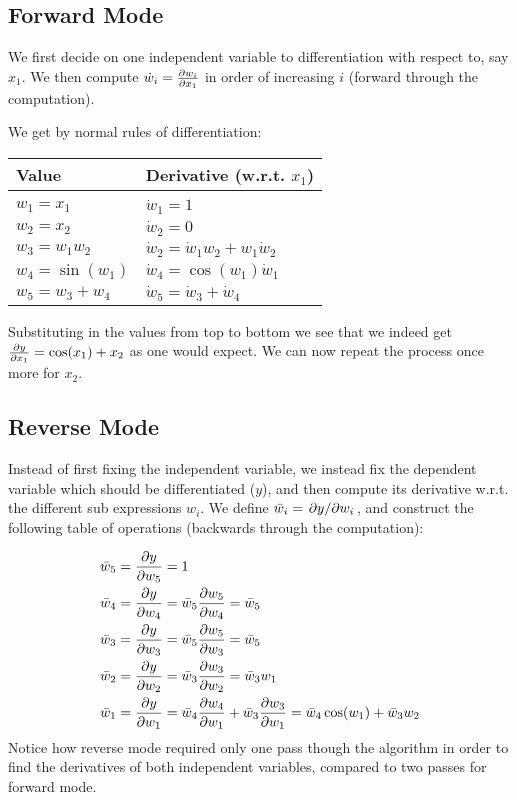 \documentclass[Thesis.tex]{subfiles}
\begin{document}
\subsection{Forward Mode}

We first decide on one independent variable to differentiation with respect to,
say $x_1$. We then compute $\dot w_i = \pdv{w_i}{x_1}$ in order of increasing
$i$ (forward through the computation).

We get by normal rules of differentiation:

\begin{center}
  \begin{tabular}{ll}
    Value & Derivative (w.r.t. $x_1$)\\\hline\\
    $w_1 = x_1$ & $\dot w_1 = 1$\\
    $w_2 = x_2$ & $\dot w_2 = 0$\\
    $w_3 = w_1w_2$ & $\dot w_2 = \dot w_1 w_2 + w_1\dot w_2$\\
    $w_4 = \sin(w_1)$ & $\dot w_4 = \cos(w_1)\dot w_1$\\
    $w_5 = w_3 + w_4$ & $\dot w_5 = \dot w_3 +\dot w_4$\\
  \end{tabular}
\end{center}
Substituting in the values from top to bottom we see that we indeed get
$\pdv{y}{x_1}=\cos(x_1)+x_2$ as one would expect. We can now repeat the process
once more for $x_2$.

\subsection{Reverse Mode}

Instead of first fixing the independent variable, we
instead fix the dependent variable which should be differentiated (\(y\)), and
then compute its derivative w.r.t. the different sub expressions $w_i$. We
define \(\bar w_i = \pdv*{y}{w_i}\), and construct the following table of
operations (backwards through the computation):

\begin{align*}
  \bar w_5 &= \pdv{y}{w_5} = 1\\
  \bar w_4 &= \pdv{y}{w_4} = \bar w_5\pdv{w_5}{w_4} = \bar w_5\\
  \bar w_3 &= \pdv{y}{w_3} = \bar w_5\pdv{w_5}{w_3} = \bar w_5\\
  \bar w_2 &= \pdv{y}{w_2} = \bar w_3\pdv{w_3}{w_2} = \bar w_3 w_1\\
  \bar w_1 &= \pdv{y}{w_1} = \bar w_4\pdv{w_4}{w_1} + \bar w_3 \pdv{w_3}{w_1}= \bar w_4 \cos(w_1) + \bar w_3w_2
\end{align*}
Notice how reverse mode required only one pass though the algorithm in order to
find the derivatives of both independent variables, compared to two passes for
forward mode.
\end{document}
